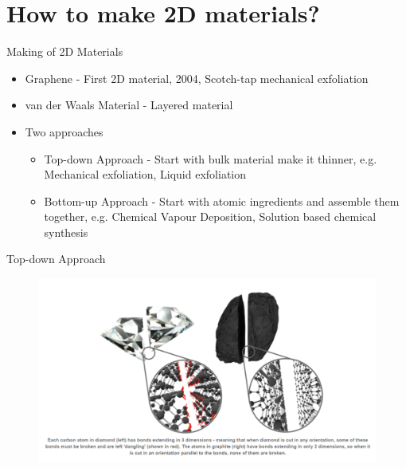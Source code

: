 \documentclass{beamer}
\begin{document}

\section{How to make 2D materials?}

\begin{frame}{Making of 2D Materials}
    \begin{itemize}
    \setlength\itemsep{2em}
        \item Graphene - First 2D material, 2004, Scotch-tap mechanical exfoliation
        \item van der Waals Material - Layered material
        \item Two approaches
        \begin{itemize}
            \item Top-down Approach - Start with bulk material make it thinner, e.g. Mechanical exfoliation, Liquid exfoliation
            \item Bottom-up Approach - Start with atomic ingredients and assemble them together, e.g. Chemical Vapour Deposition, Solution based chemical synthesis
        \end{itemize}
    \end{itemize}
\end{frame}

\begin{frame}{Top-down Approach}
    \begin{figure}
        \centering
        \includegraphics[scale=0.5]{breaking_bond.PNG}
    \end{figure}
\end{frame}
\end{document}
